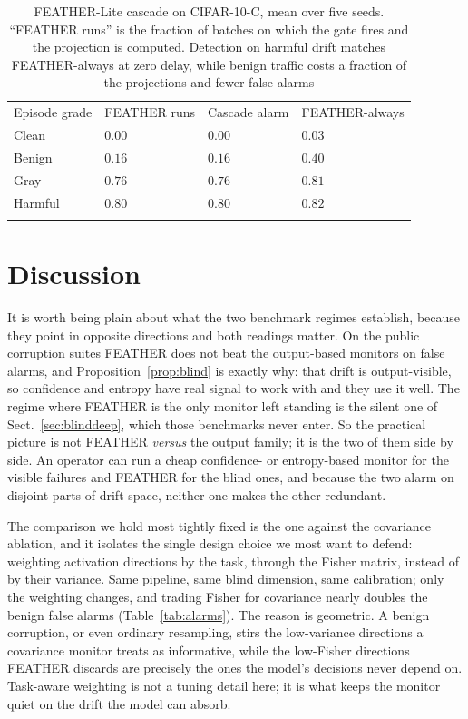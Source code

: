 \documentclass[acmsmall,screen]{acmart}
\providecommand{\svhline}{\hline}                        %
\theoremstyle{acmdefinition}
\begin{document}
\begin{table}[!t]
\caption{FEATHER-Lite cascade on CIFAR-10-C, mean over five seeds. ``FEATHER
runs'' is the fraction of batches on which the gate fires and the projection
is computed. Detection on harmful drift matches FEATHER-always at zero delay,
while benign traffic costs a fraction of the projections and fewer false
alarms}
\label{tab:cascade}
\begin{tabular}{p{2.6cm}p{2.3cm}p{2.3cm}p{2.6cm}}
\hline\noalign{\smallskip}
Episode grade & FEATHER runs & Cascade alarm & FEATHER-always \\
\noalign{\smallskip}\svhline\noalign{\smallskip}
Clean & $0.00$ & $0.00$ & $0.03$ \\
Benign & $0.16$ & $0.16$ & $0.40$ \\
Gray & $0.76$ & $0.76$ & $0.81$ \\
Harmful & $0.80$ & $0.80$ & $0.82$ \\
\noalign{\smallskip}\hline\noalign{\smallskip}
\end{tabular}
\end{table}

\section{Discussion}
\label{sec:discussion}

It is worth being plain about what the two benchmark regimes establish,
because they point in opposite directions and both readings matter. On the
public corruption suites FEATHER does not beat the output-based monitors on
false alarms, and Proposition~\ref{prop:blind} is exactly why: that drift is
output-visible, so confidence and entropy have real signal to work with and
they use it well. The regime where FEATHER is the only monitor left standing
is the silent one of Sect.~\ref{sec:blinddeep}, which those benchmarks never
enter. So the practical picture is not FEATHER \emph{versus} the output
family; it is the two of them side by side. An operator can run a cheap
confidence- or entropy-based monitor for the visible failures and FEATHER for
the blind ones, and because the two alarm on disjoint parts of drift space,
neither one makes the other redundant.

The comparison we hold most tightly fixed is the one against the covariance
ablation, and it isolates the single design choice we most want to defend:
weighting activation directions by the task, through the Fisher matrix,
instead of by their variance. Same pipeline, same blind dimension, same
calibration; only the weighting changes, and trading Fisher for covariance
nearly doubles the benign false alarms (Table~\ref{tab:alarms}). The reason is
geometric. A benign corruption, or even ordinary resampling, stirs the
low-variance directions a covariance monitor treats as informative, while the
low-Fisher directions FEATHER discards are precisely the ones the model's
decisions never depend on. Task-aware weighting is not a tuning detail here;
it is what keeps the monitor quiet on the drift the model can absorb.
\end{document}
